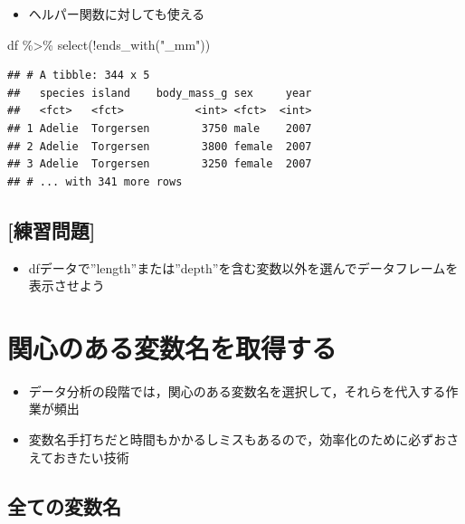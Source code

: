 \documentclass[
  xelatex,ja=standard, b5paper]{bxjsbook}
\newenvironment{Shaded}{\begin{snugshade}}{\end{snugshade}}
\newcommand{\FunctionTok}[1]{\textcolor[rgb]{0.00,0.00,0.00}{#1}}
\newcommand{\NormalTok}[1]{#1}
\newcommand{\SpecialCharTok}[1]{\textcolor[rgb]{0.00,0.00,0.00}{#1}}
\newcommand{\StringTok}[1]{\textcolor[rgb]{0.31,0.60,0.02}{#1}}
\providecommand{\tightlist}{%
  \setlength{\itemsep}{0pt}\setlength{\parskip}{0pt}}
\begin{document}
\begin{itemize}
\tightlist
\item
  ヘルパー関数に対しても使える
\end{itemize}

\begin{Shaded}
\begin{Highlighting}[]
\NormalTok{df }\SpecialCharTok{\%\textgreater{}\%} 
  \FunctionTok{select}\NormalTok{(}\SpecialCharTok{!}\FunctionTok{ends\_with}\NormalTok{(}\StringTok{"\_mm"}\NormalTok{))}
\end{Highlighting}
\end{Shaded}

\begin{verbatim}
## # A tibble: 344 x 5
##   species island    body_mass_g sex     year
##   <fct>   <fct>           <int> <fct>  <int>
## 1 Adelie  Torgersen        3750 male    2007
## 2 Adelie  Torgersen        3800 female  2007
## 3 Adelie  Torgersen        3250 female  2007
## # ... with 341 more rows
\end{verbatim}

\hypertarget{ux7df4ux7fd2ux554fux984c-2}{%
\subsection{{[}練習問題{]}}\label{ux7df4ux7fd2ux554fux984c-2}}

\begin{itemize}
\tightlist
\item
  dfデータで''length''または''depth''を含む変数以外を選んでデータフレームを表示させよう
\end{itemize}

\hypertarget{select-get}{%
\section{関心のある変数名を取得する}\label{select-get}}

\begin{itemize}
\tightlist
\item
  データ分析の段階では，関心のある変数名を選択して，それらを代入する作業が頻出
\item
  変数名手打ちだと時間もかかるしミスもあるので，効率化のために必ずおさえておきたい技術
\end{itemize}

\hypertarget{select-get-name}{%
\subsection{全ての変数名}\label{select-get-name}}
\end{document}
